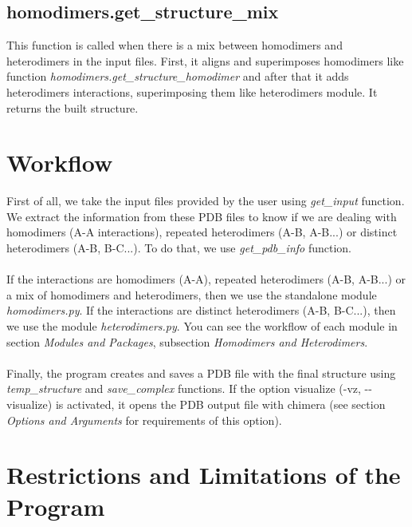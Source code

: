 \documentclass[a4paper,12pt]{report}
\begin{document}
\subsection{homodimers.get\_structure\_mix}

This function is called when there is a mix between homodimers and heterodimers in the input files. First, it aligns and superimposes homodimers like function \textit{homodimers.get\_structure\_homodimer} and after that it adds heterodimers interactions, superimposing them like heterodimers module. It returns the built structure.


\section{Workflow}

First of all, we take the input files provided by the user using \textit{get\_input} function. We extract the information from these PDB files to know if we are dealing with homodimers (A-A interactions), repeated heterodimers (A-B, A-B...) or distinct heterodimers (A-B, B-C...). To do that, we use \textit{get\_pdb\_info} function.\\\\
If the interactions are homodimers (A-A), repeated heterodimers (A-B, A-B...) or a mix of homodimers and heterodimers, then we use the standalone module \textit{homodimers.py}. If the interactions are distinct heterodimers (A-B, B-C...), then we use the module \textit{heterodimers.py}. You can see the workflow of each module in section \textit{Modules and Packages}, subsection \textit{Homodimers and Heterodimers}.\\\\
Finally, the program creates and saves a PDB file with the final structure using \textit{temp\_structure} and \textit{save\_complex} functions. If the option visualize (-vz, -{}-visualize) is activated, it opens the PDB output file with chimera (see section \textit{Options and Arguments} for requirements of this option).


\section{Restrictions and Limitations of the Program}
\end{document}
